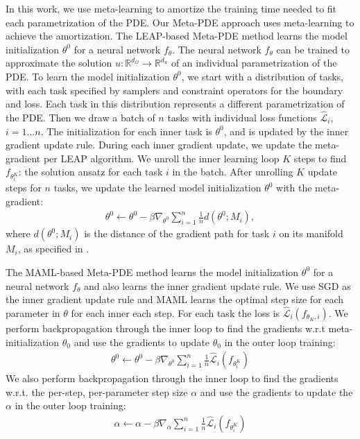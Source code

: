 In this work, we use meta-learning to amortize the training time needed to fit each parametrization of the PDE. Our Meta-PDE approach uses meta-learning to achieve the amortization. The LEAP-based Meta-PDE method learns the model initialization $\theta^0$ for a neural network $f_\theta$. The neural network $f_\theta$ can be trained to approximate the solution $u: \mathbb{R}^{d_\Omega} \to \mathbb{R}^{d_u}$ of an individual parametrization of the PDE. To learn the model initialization $\theta^0$, we start with a distribution of tasks, with each task specified by samplers and constraint operators for the boundary and loss. Each task in this distribution represents a different parametrization of the PDE. Then we draw a batch of $n$ tasks with individual loss functions $\hat{\mathcal{L}}_i$, $i = 1 ... n$. The initialization for each inner task is $\theta^0$, and is updated by the inner gradient update rule. During each inner gradient update, we update the meta-gradient per LEAP algorithm. We unroll the inner learning loop $K$ steps to find $f_{\theta_i^K}$: the solution ansatz for each task $i$ in the batch. After unrolling $K$ update steps for $n$ tasks, we update the learned model initialization $\theta^0$ with the meta-gradient:
\begin{align}
    \theta^0 \leftarrow \theta^0 - \beta \nabla_{\theta^0}\sum_{i=1}^n \frac{1}{n} d(\theta^0; M_i),
\end{align}
where $d(\theta^0; M_i)$ is the distance of the gradient path for task $i$ on its manifold $M_i$, as specified in \citep{flennerhag2018transferring}.

The MAML-based Meta-PDE method learns the model initialization $\theta^0$ for a neural network $f_\theta$ and also learns the inner gradient update rule. We use SGD as the inner gradient update rule and MAML learns the optimal step size for each parameter in $\theta$ for each inner each step. For each task the loss is $\hat{\mathcal{L}}_i(f_{\theta_K, i})$. We perform backpropagation through the inner loop to find the gradients w.r.t meta-initialization $\theta_0$ and use the gradients to update $\theta_0$ in the outer loop training:
\begin{align}
    \theta^0 \leftarrow \theta^0 - \beta \nabla_{\theta^0} \sum_{i=1}^n  \frac{1}{n} \hat{\mathcal{L}}_i(f_{\theta^K _i})
\end{align}
We also perform backpropagation through the inner loop to find the gradients w.r.t. the per-step, per-parameter step size $\alpha$ and use the gradients to update the $\alpha$ in the outer loop training:
\begin{align}
    {\alpha}  \leftarrow {\alpha} - \beta  \nabla_{\alpha} \sum_{i=1}^n  \frac{1}{n} \hat{\mathcal{L}}_i(f_{\theta^K_i})
\end{align}

